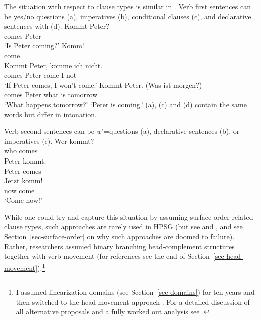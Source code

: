 \documentclass[output=paper,biblatex,babelshorthands,newtxmath,draftmode,colorlinks,citecolor=brown]{langscibook}
\begin{document}
The situation with respect to clause types is similar in . Verb first sentences can be
yes/no questions (a), imperatives (b), conditional clauses (c), and declarative
sentences with  (d). 
\eal
\ex\label{ex-kommt-peter-question}
\gll Kommt Peter?\\
     comes Peter\\\german
\glt `Is Peter coming?'
\ex 
\gll Komm!\\
     come\\
\ex\label{ex-kommt-peter-conditional}
\gll Kommt Peter, komme ich nicht.\\
     comes Peter  come  I not\\
\glt `If Peter comes, I won't come.'
\ex 
\gll Kommt Peter. (Was ist morgen?)\\
     comes Peter  \hphantom{(}what is tomorrow\\
\glt `What happens tomorrow?' `Peter is coming.'
\zl
(a), (c) and (d) contain the same words but differ in intonation.

Verb second sentences can be \emph{w}"=questions (a), declarative sentences (b), or imperatives (c).
\eal
\ex 
\gll Wer kommt?\\
     who comes\\\german
\ex 
\gll Peter kommt.\\
     Peter comes\\
\ex 
\gll Jetzt komm!\\
     now   come\\
\glt `Come now!'
\zl

\largerpage
\noindent
While one could try and capture this situation by assuming surface order-related clause types, such approaches are rarely
used in HPSG (but see  and , and see Section~\ref{sec-surface-order} on why such approaches
are doomed to failure). Rather, researchers assumed binary branching head-complement structures
together with verb movement (for references see the end of
Section~\ref{sec-head-movement}).\footnote{%
I assumed linearization domains (see Section~\ref{sec-domains}) for ten
years and then switched to the head-movement approach
\citep{Mueller2005c,Mueller2005d,MuellerGS}. For a detailed discussion of all alternative proposals
and a fully worked out analysis see .%
} 
\end{document}
